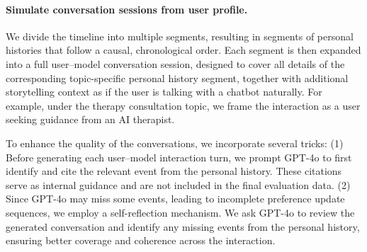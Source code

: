 \paragraph{Simulate conversation sessions from user profile.}
We divide the timeline into multiple segments, resulting in segments of personal histories that follow a causal, chronological order. Each segment is then expanded into a full user–model conversation session, designed to cover all details of the corresponding topic-specific personal history segment, together with additional storytelling context as if the user is talking with a chatbot naturally. For example, under the therapy consultation topic, we frame the interaction as a user seeking guidance from an AI therapist. 

To enhance the quality of the conversations, we incorporate several tricks: (1) Before generating each user–model interaction turn, we prompt GPT-4o to first identify and cite the relevant event from the personal history. These citations serve as internal guidance and are not included in the final evaluation data. (2) Since GPT-4o may miss some events, leading to incomplete preference update sequences, we employ a self-reflection mechanism. We ask GPT-4o to review the generated conversation and identify any missing events from the personal history, ensuring better coverage and coherence across the interaction.





